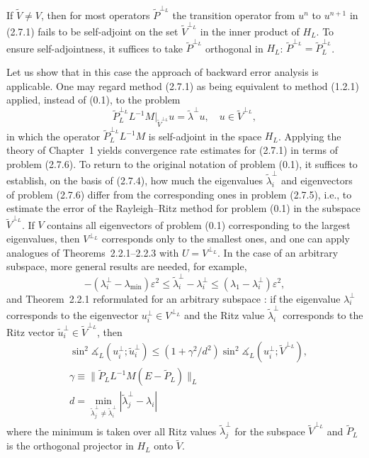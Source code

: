 \documentclass[11pt,oneside]{book}
\newcommand{\ang}{\measuredangle}
\begin{document}
If $\widetilde{V} \neq V$, then for most operators $\widetilde{P}^{\perp_L}$ the transition operator from $u^n$ to $u^{n+1}$ in (2.7.1) fails to be self-adjoint on the set $\widetilde{V}^{\perp_L}$ in the inner product of $H_L$. To ensure self-adjointness, it suffices to take $\widetilde{P}^{\perp_L}$ orthogonal in $H_L$: $\widetilde{P}^{\perp_L} = \widetilde{P}_L^{\perp_L}$.

Let us show that in this case the approach of backward error analysis is applicable. One may regard method (2.7.1) as being equivalent to method (1.2.1) applied, instead of (0.1), to the problem
\[
\widetilde{P}_L^{\perp_L} L^{-1}M\big|_{\widetilde{V}^{\perp_L}} u = \tilde{\lambda}^\perp u, \quad u \in \widetilde{V}^{\perp_L}, \tag{2.7.6}
\]
in which the operator $\widetilde{P}_L^{\perp_L} L^{-1}M$ is self-adjoint in the space $H_L$. Applying the theory of Chapter~1 yields convergence rate estimates for (2.7.1) in terms of problem (2.7.6). To return to the original notation of problem (0.1), it suffices to establish, on the basis of (2.7.4), how much the eigenvalues $\tilde{\lambda}_i^\perp$ and eigenvectors of problem (2.7.6) differ from the corresponding ones in problem (2.7.5), i.e., to estimate the error of the Rayleigh--Ritz method for problem (0.1) in the subspace $\widetilde{V}^{\perp_L}$. If $V$ contains all eigenvectors of problem (0.1) corresponding to the largest eigenvalues, then $V^{\perp_L}$ corresponds only to the smallest ones, and one can apply analogues of Theorems~2.2.1--2.2.3 with $U = V^{\perp_L}$. In the case of an arbitrary subspace, more general results are needed, for example,
\[
-(\lambda_i^\perp - \lambda_{\min})\varepsilon^2 \leqslant \tilde{\lambda}_i^\perp - \lambda_i^\perp \leqslant (\lambda_1 - \lambda_i^\perp)\varepsilon^2,
\]
and Theorem~2.2.1 reformulated for an arbitrary subspace \citep{Saad1983}: if the eigenvalue $\lambda_i^\perp$ corresponds to the eigenvector $u_i^\perp \in V^{\perp_L}$ and the Ritz value $\tilde{\lambda}_i^\perp$ corresponds to the Ritz vector $\tilde{u}_i^\perp \in \widetilde{V}^{\perp_L}$, then
\[
\begin{aligned}
&\sin^2 \ang_L(u_i^\perp; \tilde{u}_i^\perp) \leqslant (1 + \gamma^2 / d^2) \sin^2 \ang_L(u_i^\perp; \widetilde{V}^{\perp_L}), \\[1ex]
&\gamma \equiv \|\widetilde{P}_L L^{-1}M (E - \widetilde{P}_L)\|_L \\[1ex]
&d = \min_{\tilde{\lambda}_j^\perp \neq \tilde{\lambda}_i^\perp} |\tilde{\lambda}_j^\perp - \lambda_i| %
\end{aligned}
\]
where the minimum is taken over all Ritz values $\tilde{\lambda}_j^\perp$ for the subspace $\widetilde{V}^{\perp_L}$ and $\widetilde{P}_L$ is the orthogonal projector in $H_L$ onto $\widetilde{V}$.
\end{document}
